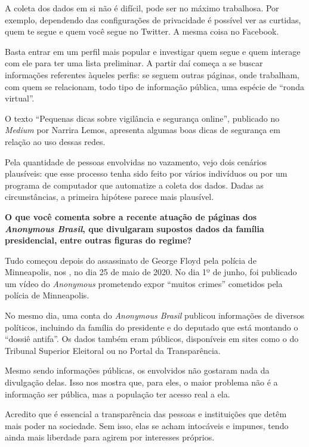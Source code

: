 A coleta dos dados em si não é difícil, pode ser no máximo trabalhosa.
Por exemplo, dependendo das configurações de privacidade é possível ver
as curtidas, quem te segue e quem você segue no Twitter. A mesma coisa
no Facebook.

Basta entrar em um perfil mais popular e investigar quem segue e quem
interage com ele para ter uma lista preliminar. A partir daí começa a se
buscar informações referentes àqueles perfis: se seguem outras páginas,
onde trabalham, com quem se relacionam, todo tipo de informação pública,
uma espécie de ``ronda virtual''.

O texto ``Pequenas dicas sobre vigilância e segurança online'', publicado no \emph{Medium} por Narrira Lemos, apresenta algumas boas dicas de segurança em relação ao uso
dessas redes.

Pela quantidade de pessoas envolvidas no vazamento, vejo dois cenários
plausíveis: que esse processo tenha sido feito por vários indivíduos ou
por um programa de computador que automatize a coleta dos dados. Dadas
as circunstâncias, a primeira hipótese parece mais plausível.

\bigskip

\noindent{}\textbf{O que você comenta sobre a recente atuação de páginas dos \emph{Anonymous Brasil}, que divulgaram supostos dados da família presidencial, entre
outras figuras do regime?}

Tudo começou depois do assassinato de George Floyd
pela polícia de Minneapolis, nos , no dia 25 de maio de 2020. No dia
1º de junho, foi publicado um vídeo do \emph{Anonymous} prometendo expor
``muitos crimes'' cometidos pela polícia de Minneapolis.

No mesmo dia, uma conta do \emph{Anonymous Brasil} publicou informações de
diversos políticos, incluindo da família do presidente e do deputado que
está montando o ``dossiê antifa''. Os dados também eram públicos,
disponíveis em sites como o do Tribunal Superior Eleitoral ou no Portal
da Transparência.

Mesmo sendo informações públicas, os envolvidos não gostaram nada da
divulgação delas. Isso nos mostra que, para eles, o maior problema não é
a informação ser pública, mas a população ter acesso real a ela.

Acredito que é essencial a transparência das pessoas e instituições que
detêm mais poder na sociedade. Sem isso, elas se acham intocáveis e
impunes, tendo ainda mais liberdade para agirem por interesses próprios.


